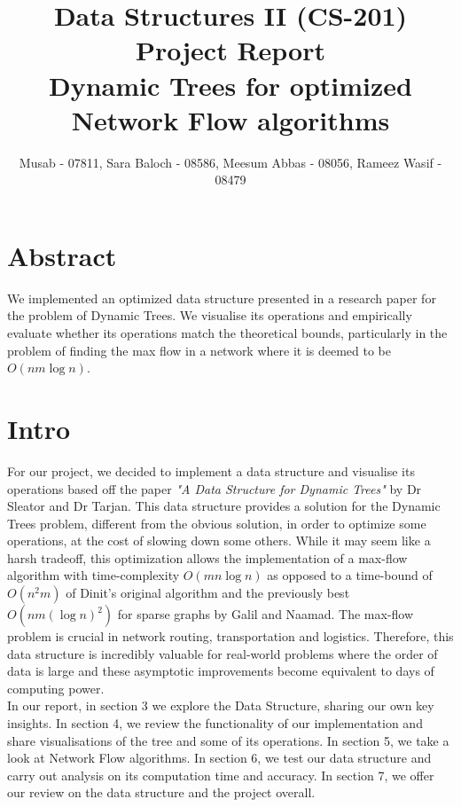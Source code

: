 \documentclass[a4paper, 11pt]{article}
\title{Data Structures II (CS-201) Project Report \\ Dynamic Trees for optimized Network Flow algorithms}
\author{Musab - 07811, Sara Baloch - 08586, Meesum Abbas - 08056, Rameez Wasif - 08479}
\begin{document}
\maketitle
\pagebreak
\tableofcontents
\pagebreak

\section{Abstract}
We implemented an optimized data structure presented in a research paper for the problem of Dynamic Trees. We visualise its operations and empirically evaluate whether its operations match the theoretical bounds, particularly in the problem of finding the max flow in a network where it is deemed to be $O(nm\log{n})$.

\pagebreak

\section{Intro}

For our project, we decided to implement a data structure and visualise its operations based off the paper \emph{"A Data Structure for Dynamic Trees"} \cite{DynamicTrees} by Dr Sleator and Dr Tarjan. This data structure provides a solution for the Dynamic Trees problem, different from the obvious solution, in order to optimize some operations, at the cost of slowing down some others. While it may seem like a harsh tradeoff, this optimization allows the implementation of a max-flow algorithm with time-complexity $O(mn\log{n})$ as opposed to a time-bound of $O(n^2m)$ of Dinit's original algorithm and the previously best $O(nm(\log{n})^2)$ for sparse graphs by Galil and Naamad. The max-flow problem is crucial in network routing, transportation and logistics. Therefore, this data structure is incredibly valuable for real-world problems where the order of data is large and these asymptotic improvements become equivalent to days of computing power.
\\
In our report, in section 3 we explore the Data Structure, sharing our own key insights. In section 4, we review the functionality of our implementation and share visualisations of the tree and some of its operations. In section 5, we take a look at Network Flow algorithms. In section 6, we test our data structure and carry out analysis on its computation time and accuracy. In section 7, we offer our review on the data structure and the project overall.

\pagebreak
\end{document}
